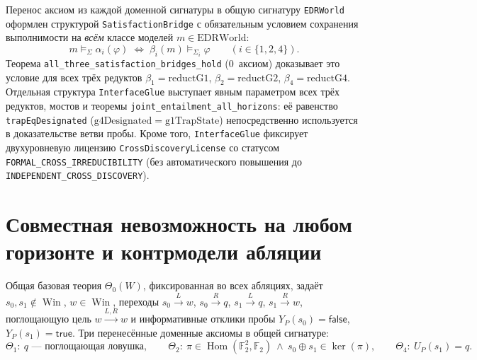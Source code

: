 \documentclass[10pt,a4paper]{article}
\theoremstyle{cleanthm}
\theoremstyle{cleandef}
\DeclareMathOperator{\Win}{Win}
\DeclareMathOperator{\Hom}{Hom}
\begin{document}
Перенос аксиом из каждой доменной сигнатуры в общую сигнатуру \texttt{EDRWorld} оформлен структурой \texttt{Satisfaction\allowbreak Bridge} с обязательным условием сохранения выполнимости на \emph{всём} классе моделей $m\in\mathrm{EDRWorld}$:
\begin{equation}
  m\models_\Sigma \alpha_i(\varphi) \;\iff\; \beta_i(m)\models_{\Sigma_i} \varphi \qquad (i\in\{1,2,4\}).
\end{equation}
Теорема \texttt{all\_\allowbreak three\_\allowbreak satisfaction\_\allowbreak bridges\_\allowbreak hold} (0~аксиом) доказывает это условие для всех трёх редуктов $\beta_1=\mathrm{reductG1}$, $\beta_2=\mathrm{reductG2}$, $\beta_4=\mathrm{reductG4}$. Отдельная структура \texttt{InterfaceGlue} выступает явным параметром всех трёх редуктов, мостов и теоремы \texttt{joint\_\allowbreak entailment\_\allowbreak all\_\allowbreak horizons}: её равенство \texttt{trapEqDesignated} ($\mathrm{g4Designated}=\mathrm{g1TrapState}$) непосредственно используется в доказательстве ветви пробы. Кроме того, \texttt{InterfaceGlue} фиксирует двухуровневую лицензию \texttt{CrossDiscoveryLicense} со статусом \texttt{FORMAL\_\allowbreak CROSS\_\allowbreak IRREDUCIBILITY} (без автоматического повышения до \texttt{INDEPENDENT\_\allowbreak CROSS\_\allowbreak DISCOVERY}).

\section{Совместная невозможность на любом горизонте и контрмодели абляции}

Общая базовая теория $\Theta_0(W)$, фиксированная во всех абляциях, задаёт $s_0,s_1\notin\Win$, $w\in\Win$, переходы $s_0\xrightarrow{L}w$, $s_0\xrightarrow{R}q$, $s_1\xrightarrow{L}q$, $s_1\xrightarrow{R}w$, поглощающую цель $w\xrightarrow{L,R}w$ и информативные отклики пробы $Y_P(s_0)=\mathsf{false}$, $Y_P(s_1)=\mathsf{true}$. Три перенесённые доменные аксиомы в общей сигнатуре:
\begin{equation}
  \Theta_1:\ q\text{ — поглощающая ловушка},\qquad
  \Theta_2:\ \pi\in\Hom(\mathbb{F}_2^2,\mathbb{F}_2)\ \land\ s_0\oplus s_1\in\ker(\pi),\qquad
  \Theta_4:\ U_P(s_1)=q.
\end{equation}
\end{document}
